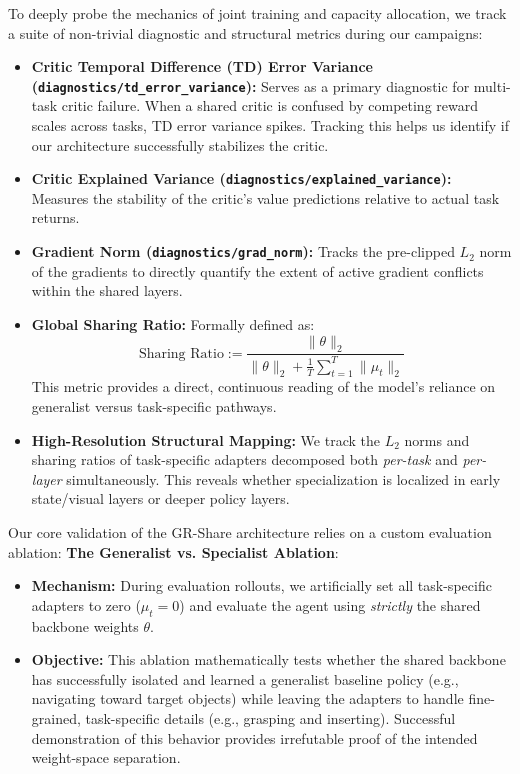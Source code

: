 \documentclass[11pt,a4paper]{article}
\begin{document}
To deeply probe the mechanics of joint training and capacity allocation, we track a suite of non-trivial diagnostic and structural metrics during our campaigns:
\begin{itemize}
    \item \textbf{Critic Temporal Difference (TD) Error Variance (\texttt{diagnostics/td\_error\_variance}):} Serves as a primary diagnostic for multi-task critic failure. When a shared critic is confused by competing reward scales across tasks, TD error variance spikes. Tracking this helps us identify if our architecture successfully stabilizes the critic.
    \item \textbf{Critic Explained Variance (\texttt{diagnostics/explained\_variance}):} Measures the stability of the critic's value predictions relative to actual task returns.
    \item \textbf{Gradient Norm (\texttt{diagnostics/grad\_norm}):} Tracks the pre-clipped $L_2$ norm of the gradients to directly quantify the extent of active gradient conflicts within the shared layers.
    \item \textbf{Global Sharing Ratio:} Formally defined as:
    \begin{equation}
        \text{Sharing Ratio} := \frac{\|\theta\|_2}{\|\theta\|_2 + \frac{1}{T}\sum_{t=1}^T \|\mu_t\|_2}
    \end{equation}
    This metric provides a direct, continuous reading of the model's reliance on generalist versus task-specific pathways.
    \item \textbf{High-Resolution Structural Mapping:} We track the $L_2$ norms and sharing ratios of task-specific adapters decomposed both \textit{per-task} and \textit{per-layer} simultaneously. This reveals whether specialization is localized in early state/visual layers or deeper policy layers.
\end{itemize}

Our core validation of the GR-Share architecture relies on a custom evaluation ablation: \textbf{The Generalist vs. Specialist Ablation}:
\begin{itemize}
    \item \textbf{Mechanism:} During evaluation rollouts, we artificially set all task-specific adapters to zero ($\mu_t = 0$) and evaluate the agent using \textit{strictly} the shared backbone weights $\theta$.
    \item \textbf{Objective:} This ablation mathematically tests whether the shared backbone has successfully isolated and learned a generalist baseline policy (e.g., navigating toward target objects) while leaving the adapters to handle fine-grained, task-specific details (e.g., grasping and inserting). Successful demonstration of this behavior provides irrefutable proof of the intended weight-space separation.
\end{itemize}
\end{document}
